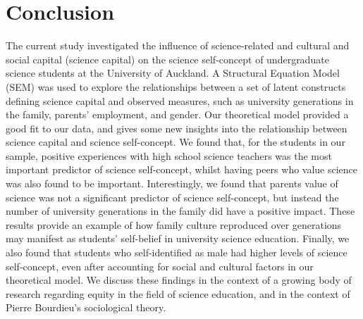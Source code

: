 \section*{Conclusion}
The current study investigated the influence of science-related and cultural and social capital (science capital) on the science self-concept of undergraduate science students at the University of Auckland. A Structural Equation Model (SEM) was used to explore the relationships between a set of latent constructs defining science capital and observed measures, such as university generations in the family, parents' employment, and gender. Our theoretical model provided a good fit to our data, and gives some new insights into the relationship between science capital and science self-concept. We found that, for the students in our sample, positive experiences with high school science teachers was the most important predictor of science self-concept, whilst having peers who value science was also found to be important. Interestingly, we found that parents value of science was not a significant predictor of science self-concept, but instead the number of university generations in the family did have a positive impact. These results provide an example of how family culture reproduced over generations may manifest as students' self-belief in university science education. Finally, we also found that students who self-identified as male had higher levels of science self-concept, even after accounting for social and cultural factors in our theoretical model. We discuss these findings in the context of a growing body of research regarding equity in the field of science education, and in the context of Pierre Bourdieu's sociological theory.  





